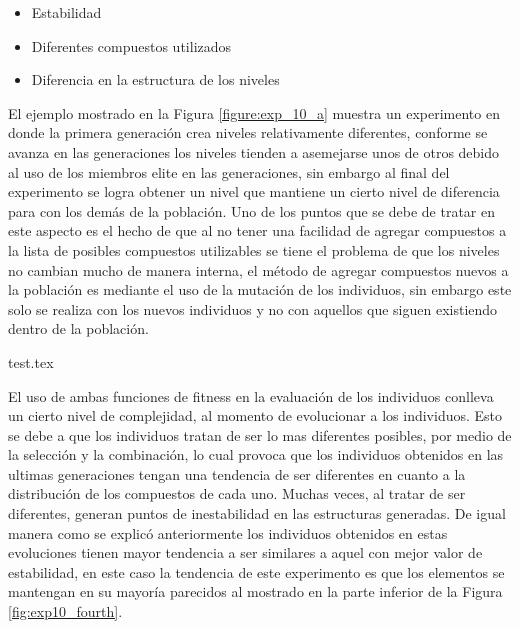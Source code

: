 \begin{itemize}
  \item Estabilidad
  \item Diferentes compuestos utilizados
  \item Diferencia en la estructura de los niveles
\end{itemize}

El ejemplo mostrado en la Figura \ref{figure:exp_10_a} muestra un experimento en
donde la primera generación crea niveles relativamente diferentes, conforme se
avanza en las generaciones los niveles tienden a asemejarse unos de otros debido
al uso de los miembros elite en las generaciones, sin embargo al final del
experimento se logra obtener un nivel que mantiene un cierto nivel de diferencia
para con los demás de la población. Uno de los puntos que se debe de tratar en
este aspecto es el hecho de que al no tener una facilidad de agregar compuestos
a la lista de posibles compuestos utilizables se tiene el problema de que los
niveles no cambian mucho de manera interna, el método de agregar compuestos
nuevos a la población es mediante el uso de la mutación de los individuos, sin
embargo este solo se realiza con los nuevos individuos y no con aquellos que
siguen existiendo dentro de la población.

{test.tex}

El uso de ambas funciones de fitness en la evaluación de los individuos conlleva
un cierto nivel de complejidad, al momento de evolucionar a los individuos. Esto
se debe a que los individuos tratan de ser lo mas diferentes posibles, por medio
de la selección y la combinación, lo cual provoca que los individuos obtenidos en las
ultimas generaciones tengan una tendencia de ser diferentes en cuanto a la
distribución de los compuestos de cada uno. Muchas veces, al tratar de ser
diferentes, generan puntos de inestabilidad en las estructuras generadas. De
igual manera como se explicó anteriormente los individuos obtenidos en estas
evoluciones tienen mayor tendencia a ser similares a aquel con mejor valor de
estabilidad, en este caso la tendencia de este experimento es que los elementos
se mantengan en su mayoría parecidos al mostrado en la parte inferior de la
Figura \ref{fig:exp10_fourth}.

